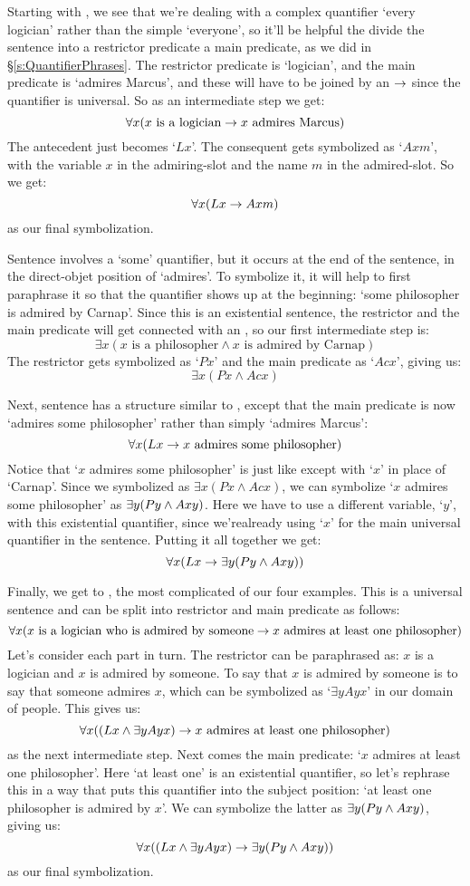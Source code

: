 Starting with , we see that we're dealing with a complex quantifier `every logician' rather than the simple `everyone', so it'll be helpful the divide the sentence into a restrictor predicate a main predicate, as we did in \S\ref{s:QuantifierPhrases}.  The restrictor predicate is `logician', and the main predicate is `admires Marcus', and these will have to be joined by an $\rightarrow$ since the quantifier is universal.  So as an intermediate step we get: $$\forall x(x \text{ is a logician} \rightarrow x \text{ admires Marcus})$$ The antecedent just becomes `$Lx$'.  The consequent gets symbolized as `$Axm$', with the variable $x$ in the admiring-slot and the name $m$ in the admired-slot.  So we get:$$\forall x(Lx \rightarrow Axm)$$ as our final symbolization.

Sentence  involves a `some' quantifier, but it occurs at the end of the sentence, in the direct-objet position of `admires'.  To symbolize it, it will help to first paraphrase it so that the quantifier shows up at the beginning: `some philosopher is admired by Carnap'.  Since this is an existential sentence, the restrictor and the main predicate will get connected with an \eand, so our first intermediate step is:$$\exists x(x \text{ is a philosopher} \land x \text{ is admired by Carnap})$$The restrictor gets symbolized as `$Px$' and the main predicate as `$Acx$', giving us:$$\exists x(Px \land Acx)$$

Next, sentence  has a structure similar to , except that the main predicate is now `admires some philosopher' rather than simply `admires Marcus':$$\forall x(Lx \rightarrow x \text{ admires some philosopher})$$ Notice that `$x$ admires some philosopher' is just like  except with `$x$' in place of `Carnap'.  Since we symbolized  as $\exists x(Px \land Acx)$, we can symbolize `$x$ admires some philosopher' as $\exists y(Py \wedge Axy)$.  Here we have to use a different variable, `$y$', with this existential quantifier, since we'realready using `$x$' for the main universal quantifier in the sentence.  Putting it all together we get:$$\forall x(Lx \rightarrow \exists y(Py \wedge Axy))$$


Finally, we get to , the most complicated of our four examples.  This is a universal sentence and can be split into restrictor and main predicate as follows:$$\forall x(x \text{ is a logician who is admired by someone} \rightarrow x \text{ admires at least one philosopher})$$Let's consider each part in turn.  The restrictor can be paraphrased as: $x$ is a logician and $x$ is admired by someone.  To say that $x$ is admired by someone is to say that someone admires $x$, which can be symbolized as `$\exists yAyx$' in our domain of people.  This gives us:$$\forall x((Lx \wedge \exists yAyx) \rightarrow x \text{ admires at least one philosopher})$$as the next intermediate step.  Next comes the main predicate: `$x$ admires at least one philosopher'.  Here `at least one' is an existential quantifier, so let's rephrase this in a way that puts this quantifier into the subject position: `at least one philosopher is admired by $x$'.  We can symbolize the latter as $\exists y(Py \wedge Axy)$, giving us: $$\forall x((Lx \wedge \exists yAyx) \rightarrow \exists y(Py \wedge Axy))$$as our final symbolization.


